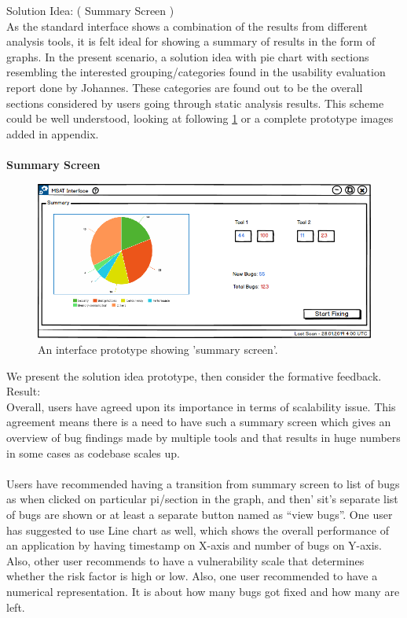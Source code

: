 Solution Idea: ( Summary Screen ) \\

As the standard interface shows a combination of the results from different analysis tools, it is felt ideal for showing a summary of results in the form of graphs. In the present scenario, a solution idea with pie chart with sections resembling the interested grouping/categories found in the usability evaluation report done by Johannes. These categories are found out to be the overall sections considered by users going through static analysis results.  This scheme could be well understood, looking at following \ref{fig:ux1_summary_screen} or a complete prototype images added in appendix. \\ \\

\textbf{Summary Screen}
\begin{figure}[hbt!]
	\centering
	\includegraphics[width=\linewidth]{figures/ux1_summary_screen}
	\caption{An interface prototype showing 'summary screen'.}
	\label{fig:ux1_summary_screen}
\end{figure}

We present the solution idea prototype, then consider the formative feedback. \\

Result: \\

Overall, users have agreed upon its importance in terms of scalability issue. This agreement means there is a need to have such a summary screen which gives an overview of bug findings made by multiple tools and that results in huge numbers in some cases as codebase scales up. \\ \\

Users have recommended having a transition from summary screen to list of bugs as when clicked on particular pi/section in the graph, and then’  sit’s separate list of bugs are shown or at least a separate button named as “view bugs”. One user has suggested to use Line chart as well, which shows the overall performance of an application by having timestamp on X-axis and number of bugs on Y-axis. Also, other user recommends to have a vulnerability scale that determines whether the risk factor is high or low. Also, one user recommended to have a numerical representation. It is about how many bugs got fixed and how many are left. \\ \\

